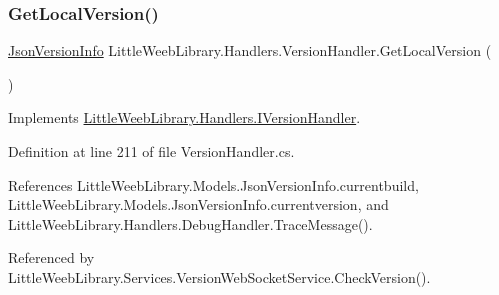 \subsubsection{\texorpdfstring{Get\+Local\+Version()}{GetLocalVersion()}}
{\footnotesize\ttfamily \mbox{\hyperlink{class_little_weeb_library_1_1_models_1_1_json_version_info}{Json\+Version\+Info}} Little\+Weeb\+Library.\+Handlers.\+Version\+Handler.\+Get\+Local\+Version (\begin{DoxyParamCaption}{ }\end{DoxyParamCaption})}



Implements \mbox{\hyperlink{interface_little_weeb_library_1_1_handlers_1_1_i_version_handler_a0358d04d17b2333448008eb793add5ae}{Little\+Weeb\+Library.\+Handlers.\+I\+Version\+Handler}}.



Definition at line 211 of file Version\+Handler.\+cs.



References Little\+Weeb\+Library.\+Models.\+Json\+Version\+Info.\+currentbuild, Little\+Weeb\+Library.\+Models.\+Json\+Version\+Info.\+currentversion, and Little\+Weeb\+Library.\+Handlers.\+Debug\+Handler.\+Trace\+Message().



Referenced by Little\+Weeb\+Library.\+Services.\+Version\+Web\+Socket\+Service.\+Check\+Version().


